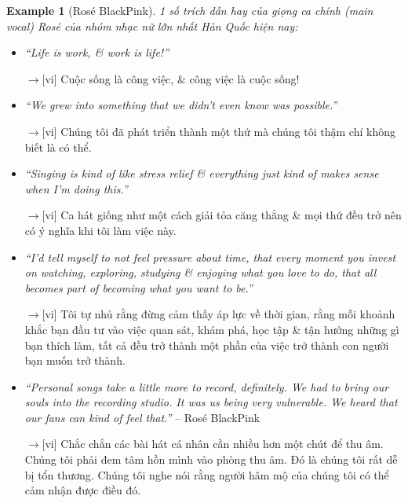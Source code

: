 \documentclass[12pt,oneside]{book}
\newtheorem{example}{Example}
\begin{document}
\begin{example}[{\sc Ros\'e BlackPink}]
	1 số trích dẫn hay của giọng ca chính (main vocal) Ros\'e của nhóm nhạc nữ lớn nhất Hàn Quốc hiện nay:
\end{example}
\begin{itemize}
	\item {\it``Life is work, \& work is life!''}
	
	{\sf[en]$\to$[vi]} Cuộc sống là công việc, \& công việc là cuộc sống!
	
	\item {\it``We grew into something that we didn't even know was possible.''}
	
	{\sf[en]$\to$[vi]} Chúng tôi đã phát triển thành một thứ mà chúng tôi thậm chí không biết là có thể.
	
	\item {\it``Singing is kind of like stress relief \& everything just kind of makes sense when I'm doing this.''}
	
	{\sf[en]$\to$[vi]} Ca hát giống như một cách giải tỏa căng thẳng \& mọi thứ đều trở nên có ý nghĩa khi tôi làm việc này.
	
	\item {\it``I'd tell myself to not feel pressure about time, that every moment you invest on watching, exploring, studying \& enjoying what you love to do, that all becomes part of becoming what you want to be.''}
	
	{\sf[en]$\to$[vi]} Tôi tự nhủ rằng đừng cảm thấy áp lực về thời gian, rằng mỗi khoảnh khắc bạn đầu tư vào việc quan sát, khám phá, học tập \& tận hưởng những gì bạn thích làm, tất cả đều trở thành một phần của việc trở thành con người bạn muốn trở thành.
	
	\item {\it``Personal songs take a little more to record, definitely. We had to bring our souls into the recording studio. It was us being very vulnerable. We heard that our fans can kind of feel that.''} -- {\sc Ros\'e BlackPink}
	
	{\sf[en]$\to$[vi]} Chắc chắn các bài hát cá nhân cần nhiều hơn một chút để thu âm. Chúng tôi phải đem tâm hồn mình vào phòng thu âm. Đó là chúng tôi rất dễ bị tổn thương. Chúng tôi nghe nói rằng người hâm mộ của chúng tôi có thể cảm nhận được điều đó.
\end{itemize}
\end{document}
